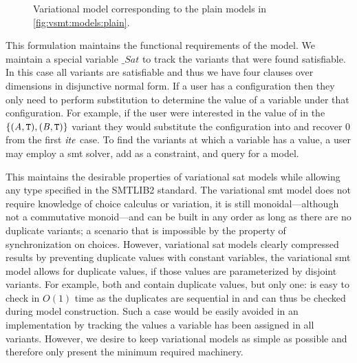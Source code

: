 \begin{figure}[h]
  \centering
  
  \caption{Variational model corresponding to the plain models in
    \autoref{fig:vsmt:models:plain}.}%
  \label{fig:vsmt:models:var}
\end{figure}

This formulation maintains the functional requirements of the model. We maintain
a special variable $\_Sat$ to track the variants that were found satisfiable. In
this case all variants are satisfiable and thus we have four clauses over
dimensions in disjunctive normal form. If a user has a configuration then they
only need to perform substitution to determine the value of a variable under
that configuration. For example, if the user were interested in the value of
\iV{} in the $\{(\mathit{A}{}, \texttt{T}{}), (\mathit{B}{}, \texttt{T}{})\}$ variant they would
substitute the configuration into \vc{\iV{}} and recover 0 from the first
$\mathit{ite}$ case. To find the variants at which a variable has a value, a user
may employ a \ac{smt} solver, add \vc{\iV{}} as a constraint, and query for a
model.

This maintains the desirable properties of variational \ac{sat} models while
allowing any type specified in the SMTLIB2 standard. The variational \ac{smt}
model does not require knowledge of choice calculus or variation, it is still
monoidal---although not a commutative monoid---and can be built in any order as
long as there are no duplicate variants; a scenario that is impossible by the
property of synchronization on choices. However, variational \ac{sat} models
clearly compressed results by preventing duplicate values with constant
variables, the variational \ac{smt} model allows for duplicate values, if those
values are parameterized by disjoint variants. For example, both \iV{} and \cV{}
contain duplicate values, but only one: \iV{} is easy to check in $O(1)$ time as
the duplicates are sequential in \vc{\iV{}} and can thus be checked during model
construction. Such a case would be easily avoided in an implementation by
tracking the values a variable has been assigned in all variants. However, we
desire to keep variational models as simple as possible and therefore only
present the minimum required machinery.



